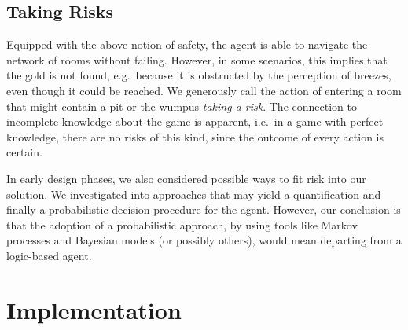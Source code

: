 \documentclass{llncs}
\begin{document}
\subsection{Taking Risks}
Equipped with the above notion of safety, the agent is able to navigate the network of rooms without failing. However, in some scenarios, this implies that the gold is not found, e.g.\ because it is obstructed by the perception of breezes, even though it could be reached. We generously call the action of entering a room that might contain a pit or the wumpus \emph{taking a risk}. The connection to incomplete knowledge about the game is apparent, i.e.\ in a game with perfect knowledge, there are no risks of this kind, since the outcome of every action is certain.

In early design phases, we also considered possible ways to fit risk into our solution.
We investigated into approaches that may yield a quantification and finally a probabilistic decision procedure for the agent.
However, our conclusion is that the adoption of a probabilistic approach, by using tools like Markov processes and Bayesian models (or possibly others), would mean departing from a logic-based agent.


\section{Implementation}
\end{document}

